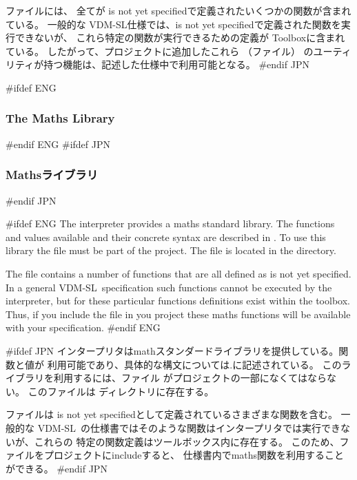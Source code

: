 \documentclass[\pformat,12pt]{article}
\newcommand{\vdmslpp}{VDM-SL}
\newcommand{\Toolbox}{Toolbox}
\newcommand{\vdmslpp}{VDM++}
\newcommand{\Toolbox}{Toolbox}
\newcommand{\keyw}[1]{{\sf #1}}
\begin{document}
ファイルには、
全てが \keyw{is not yet specified}で定義されたいくつかの関数が含まれている。
一般的な \vdmslpp 仕様では、\keyw{is not yet specified}で定義された関数を実行できないが、
これら特定の関数が実行できるための定義が \Toolbox に含まれている。
したがって、プロジェクトに追加したこれら
（ファイル）
のユーティリティが持つ機能は、記述した仕様中で利用可能となる。
#endif JPN

#ifdef ENG
\subsubsection*{The Maths Library}
#endif ENG
#ifdef JPN
\subsubsection*{Mathsライブラリ}
#endif JPN

#ifdef ENG
The interpreter provides a maths standard library. The functions and
values available and their concrete syntax are described in
\cite{LangMan-CSK}. To use this library the file
 must be part of the
project. The file is located
in the  directory.

The  file contains a number of
functions that are all defined as \keyw{is not yet specified}. In a
general \vdmslpp\ specification such functions cannot be executed by
the interpreter, but for these particular functions definitions
exist within the toolbox.  Thus, if you include the
 file in you project these maths
functions will be available with your specification.
#endif ENG

#ifdef JPN
インタープリタはmathスタンダードライブラリを提供している。関数と値が
利用可能であり、具体的な構文については\cite{LangMan-CSK}.に記述されている。
このライブラリを利用するには、ファイル
がプロジェクトの一部になくてはならない。
このファイルは ディレクトリに存在する。

ファイルは
\keyw{is not yet specified}として定義されているさまざまな関数を含む。
一般的な \vdmslpp\ の仕様書ではそのような関数はインタープリタでは実行できないが、これらの
特定の関数定義はツールボックス内に存在する。
このため、ファイルをプロジェクトにincludeすると、
仕様書内でmaths関数を利用することができる。
#endif JPN
\end{document}
